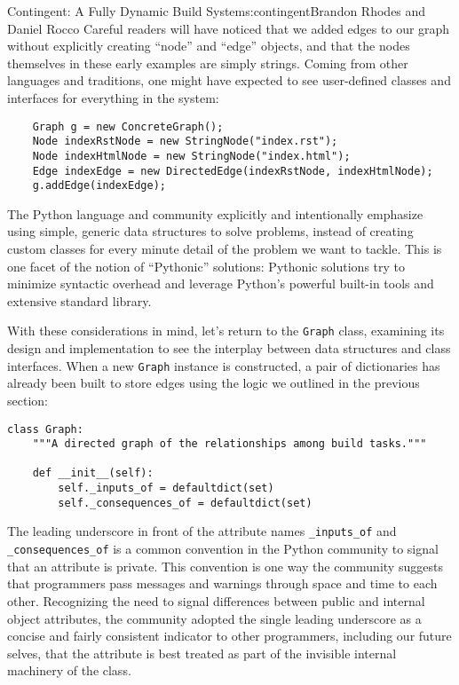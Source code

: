 \begin{aosachapter}{Contingent: A Fully Dynamic Build System}{s:contingent}{Brandon Rhodes and Daniel Rocco}
Careful readers will have noticed that we added edges to our graph
without explicitly creating ``node'' and ``edge'' objects, and that the
nodes themselves in these early examples are simply strings. Coming from
other languages and traditions, one might have expected to see
user-defined classes and interfaces for everything in the system:

\begin{verbatim}
    Graph g = new ConcreteGraph();
    Node indexRstNode = new StringNode("index.rst");
    Node indexHtmlNode = new StringNode("index.html");
    Edge indexEdge = new DirectedEdge(indexRstNode, indexHtmlNode);
    g.addEdge(indexEdge);
\end{verbatim}

The Python language and community explicitly and intentionally emphasize
using simple, generic data structures to solve problems, instead of
creating custom classes for every minute detail of the problem we want
to tackle. This is one facet of the notion of ``Pythonic'' solutions:
Pythonic solutions try to minimize syntactic overhead and leverage
Python's powerful built-in tools and extensive standard library.

With these considerations in mind, let's return to the \texttt{Graph}
class, examining its design and implementation to see the interplay
between data structures and class interfaces. When a new \texttt{Graph}
instance is constructed, a pair of dictionaries has already been built
to store edges using the logic we outlined in the previous section:

\begin{verbatim}
class Graph:
    """A directed graph of the relationships among build tasks."""

    def __init__(self):
        self._inputs_of = defaultdict(set)
        self._consequences_of = defaultdict(set)
\end{verbatim}

The leading underscore in front of the attribute names
\texttt{\_inputs\_of} and \texttt{\_consequences\_of} is a common
convention in the Python community to signal that an attribute is
private. This convention is one way the community suggests that
programmers pass messages and warnings through space and time to each
other. Recognizing the need to signal differences between public and
internal object attributes, the community adopted the single leading
underscore as a concise and fairly consistent indicator to other
programmers, including our future selves, that the attribute is best
treated as part of the invisible internal machinery of the class.


\end{aosachapter}
